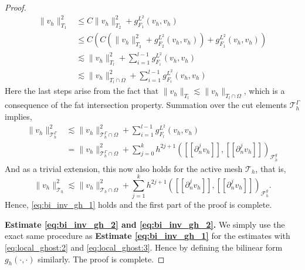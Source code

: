 \documentclass[11pt]{article}
\theoremstyle{remark}
\newcommand{\jump}[1]{\left[\!\left[ #1 \right]\!\right]}
\renewcommand{\le}{\leqslant}
\numberwithin{equation}{section}
\begin{document}
\begin{proof}
    \begin{align}
            \| v_{h} \|_{ T_{1} }^{2  }  & \le  C \| v_{h} \|_{ T_{2} }^{ 2 } + g_{F_{1}}^{L^{2}}( v_{h},v_{h})\\
              & \le  C( C( \| v_{h} \|_{ T_{3} }^{ 2 } + g_{F_{2}}^{L^{2}}( v_{h},v_{h}) ) + g_{F_{1}}^{L^{2}}( v_{h},v_{h}) )\\
              & \lesssim    \| v_{h} \|_{ T_{l} }^{ 2 }  + \sum_{i=1}^{l-1} g_{F_{i}}^{L^{2}}( v_{h},v_{h})  \\
              & \lesssim    \| v_{h} \|_{ T_{l} \cap \Omega  }^{ 2 }  + \sum_{i=1}^{l-1} g_{F_{i}}^{L^{2}}( v_{h},v_{h})
    \end{align}
            Here the last steps arise from the fact that $\|  v_{h} \|_{ T_{l} }^{  } \lesssim  \|  v_{h} \|_{ T_{l} \cap \Omega  }^{  }  $, which is a consequence of the fat intersection property.
            Summation over the cut elements $\mathcal{T} ^{\Gamma }_{h}$ implies,
            \begin{align}
                    \| v_{h} \|_{ \mathcal{T} ^{\Gamma }_h }^{2  } & \lesssim \| v_{h} \|_{ \mathcal{T} ^{\Gamma }_h\cap \Omega  }^{2  }+ \sum_{i=1}^{l-1} g_{F_{l}}^{L^{2}}( v_{h},v_{h}) \\
                                                                 & = \| v_{h} \|_{ \mathcal{T}^{\Gamma }_h \cap \Omega   }^{ 2 }  + \sum_{j=0}^{k} h^{2j+1} ( \jump{ \partial ^{j}_{n} v_{h} }, \jump{ \partial ^{j}_{n}v_{h} }    )_{\mathcal{F}_{h}^{g}}
            \end{align}
        And as a trivial extension, this now also holds for the active mesh $\mathcal{T} _{h}$, that is,
        \begin{equation}
                    \| v_{h} \|_{ \mathcal{T} _{h } }^{2  } \lesssim  \| v_{h} \|_{ \mathcal{T}_{h } \cap \Omega   }^{ 2 }  + \sum_{j=1}^{k} h^{2j+1} ( \jump{ \partial ^{j}_{n} v_{h} }, \jump{ \partial ^{j}_{n}v_{h} }    )_{\mathcal{F}_{h}^{g}}.
        \end{equation}
        Hence, \eqref{eq:bi_inv_gh_1} holds and the first part of the proof is complete.

        \textbf{Estimate \eqref{eq:bi_inv_gh_2} and \eqref{eq:bi_inv_gh_2}.}
        We simply use the exact same procedure as \textbf{Estimate \eqref{eq:bi_inv_gh_1}}  for the estimates with \eqref{eq:local_ghost:2}  and \eqref{eq:local_ghost:3}. Hence by defining the bilinear form $g_{h}( \cdot ,\cdot ) $ similarly. The proof is complete.
    \end{proof}
\end{document}
